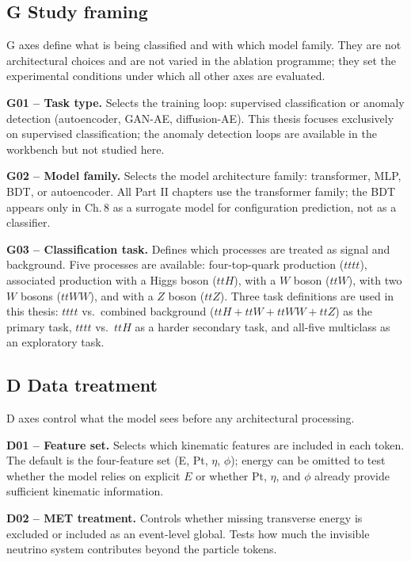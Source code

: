 \subsection*{G \quad Study framing}

G axes define what is being classified and with which model family.
They are not architectural choices and are not varied in the ablation
programme; they set the experimental conditions under which all other
axes are evaluated.

\textbf{G01 -- Task type.} Selects the training loop: supervised
classification or anomaly detection (autoencoder, GAN-AE, diffusion-AE).
This thesis focuses exclusively on supervised classification;
the anomaly detection loops are available in the workbench but not
studied here.

\textbf{G02 -- Model family.} Selects the model architecture family:
transformer, MLP, BDT, or autoencoder. All Part II chapters use the
transformer family; the BDT appears only in Ch.\,8 as a surrogate
model for configuration prediction, not as a classifier.

\textbf{G03 -- Classification task.} Defines which processes are
treated as signal and background. Five processes are available:
four-top-quark production ($tttt$), associated production with a Higgs
boson ($ttH$), with a $W$ boson ($ttW$), with two $W$ bosons ($ttWW$),
and with a $Z$ boson ($ttZ$). Three task definitions are used in this
thesis: $tttt$ vs.\ combined background ($ttH + ttW + ttWW + ttZ$) as
the primary task, $tttt$ vs.\ $ttH$ as a harder secondary task, and
all-five multiclass as an exploratory task.

\subsection*{D \quad Data treatment}

D axes control what the model sees before any architectural processing.

\textbf{D01 -- Feature set.} Selects which kinematic features are
included in each token. The default is the four-feature set
(E, Pt, $\eta$, $\phi$); energy can be omitted to test whether the
model relies on explicit $E$ or whether Pt, $\eta$, and $\phi$ already
provide sufficient kinematic information.

\textbf{D02 -- MET treatment.} Controls whether missing transverse
energy is excluded or included as an event-level global. Tests how much
the invisible neutrino system contributes beyond the particle tokens.

